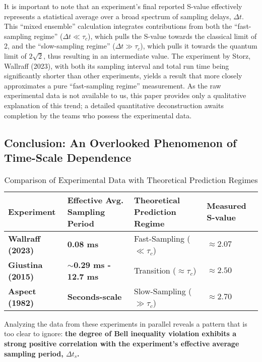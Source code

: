 \documentclass[11pt]{article}
\begin{document}
It is important to note that an experiment's final reported S-value effectively represents a statistical average over a broad spectrum of sampling delays, $\Delta t$. This ``mixed ensemble'' calculation integrates contributions from both the ``fast-sampling regime'' ($\Delta t \ll \tau_c$), which pulls the S-value towards the classical limit of 2, and the ``slow-sampling regime'' ($\Delta t \gg \tau_c$), which pulls it towards the quantum limit of $2\sqrt{2}$, thus resulting in an intermediate value. The experiment by Storz, Wallraff (2023), with both its sampling interval and total run time being significantly shorter than other experiments, yields a result that more closely approximates a pure ``fast-sampling regime'' measurement. As the raw experimental data is not available to us, this paper provides only a qualitative explanation of this trend; a detailed quantitative deconstruction awaits completion by the teams who possess the experimental data.

\subsection{Conclusion: An Overlooked Phenomenon of Time-Scale Dependence}

\begin{table}[h!]
\centering
\caption{Comparison of Experimental Data with Theoretical Prediction Regimes}
\label{tab:comparison}
\begin{tabularx}{\textwidth}{@{} >{\bfseries}l >{\centering\arraybackslash}X >{\centering\arraybackslash}X >{\centering\arraybackslash}X @{}}
\toprule
\textbf{Experiment} & \textbf{Effective Avg. Sampling Period} & \textbf{Theoretical Prediction Regime} & \textbf{Measured S-value} \\
\midrule
\textbf{Wallraff (2023)} & \textbf{0.08 ms} & Fast-Sampling ($\ll \tau_c$) & \textbf{$\approx 2.07$} \\
\textbf{Giustina (2015)} & \textbf{$\sim$0.29 ms - 12.7 ms} & Transition ($\approx \tau_c$) & \textbf{$\approx 2.50$} \\
\textbf{Aspect (1982)} & \textbf{Seconds-scale} & Slow-Sampling ($\gg \tau_c$) & \textbf{$\approx 2.70$} \\
\bottomrule
\end{tabularx}
\end{table}

Analyzing the data from these experiments in parallel reveals a pattern that is too clear to ignore: \textbf{the degree of Bell inequality violation exhibits a strong positive correlation with the experiment's effective average sampling period, $\Delta t_s$.}
\end{document}
